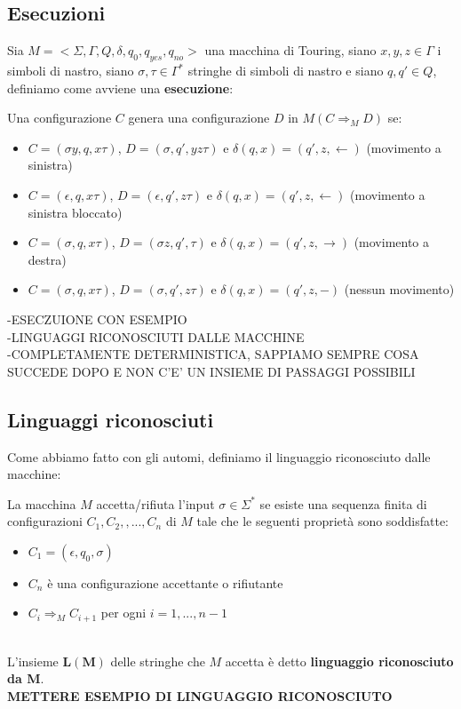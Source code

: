 \subsection{Esecuzioni}
Sia $M = <\Sigma, \Gamma,Q,\delta,q_0,q_{yes},q_{no}>$ una macchina di Touring, siano $x,y,z \in \Gamma$ i simboli di nastro,
siano $\sigma,\tau \in \Gamma^*$ stringhe di simboli di nastro e siano $q,q'\in Q$, definiamo come avviene una \textbf{esecuzione}: \smallskip\\
\colorbox{SALZO}{\parbox{\dimexpr\linewidth-2\fboxsep}{\begin{definition}
   Una configurazione $C$ genera una configurazione $D$ in $M (C \Rightarrow_M D)$ se:
   \begin{itemize}
    \item $C = (\sigma y, q, x\tau)$, $D = (\sigma, q', yz\tau)$ e $\delta(q,x) = (q',z,\leftarrow)$ (movimento a sinistra)
    \item $C = (\epsilon, q, x\tau)$, $D = (\epsilon, q', z\tau)$ e $\delta(q,x) = (q',z,\leftarrow)$ (movimento a sinistra bloccato)
    \item $C = (\sigma, q, x\tau)$, $D = (\sigma z, q', \tau)$ e $\delta(q,x) = (q',z,\rightarrow)$ (movimento a destra)
    \item $C = (\sigma, q, x\tau)$, $D = (\sigma, q', z\tau)$ e $\delta(q,x) = (q',z,-)$ (nessun movimento)
   \end{itemize}
\end{definition}}} 

-ESECZUIONE CON ESEMPIO\\
-LINGUAGGI RICONOSCIUTI DALLE MACCHINE\\
-COMPLETAMENTE DETERMINISTICA, SAPPIAMO SEMPRE COSA SUCCEDE DOPO E NON C'E' UN INSIEME DI PASSAGGI POSSIBILI



\subsection{Linguaggi riconosciuti}
Come abbiamo fatto con gli automi, definiamo il linguaggio riconosciuto dalle macchine:\smallskip\\
\colorbox{SALZO}{\parbox{\dimexpr\linewidth-2\fboxsep}{\begin{definition}
   La macchina $M$ accetta/rifiuta l'input $\sigma \in \Sigma^*$ se esiste una sequenza finita di configurazioni $C_1,C_2,,...,C_n$ di $M$
   tale che le seguenti proprietà sono soddisfatte:
   \begin{itemize}
    \item $C_1 = (\epsilon,q_0,\sigma)$
    \item $C_n$ è una configurazione accettante o rifiutante 
    \item $C_i \Rightarrow_M C_{i+1}$ per ogni $i = 1,...,n-1$
   \end{itemize}
\end{definition}}}\smallskip\\
L'insieme $\bm{L(M)}$ delle stringhe che $M$ accetta è detto \textbf{linguaggio riconosciuto da M}.\\
\textbf{METTERE ESEMPIO DI LINGUAGGIO RICONOSCIUTO}\smallskip\\

